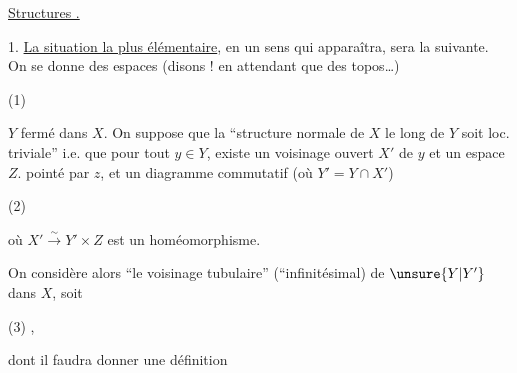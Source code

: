 
\uline{Structures .}

1. \uline{La situation la plus élémentaire}, en un sens qui apparaîtra, sera la suivante. On se donne des espaces (disons !\unsure{)|\}} en attendant que   des topos\ldots)

(1)

$Y$ fermé dans $X$. On suppose que la ``structure normale de $X$ le long de $Y$ soit loc. triviale''\unsure{)|\}} i.e. que pour tout $y\in Y$, existe un voisinage ouvert $X'$ de $y$ et un espace $Z$. pointé par $z$, et un diagramme commutatif (où $Y'=Y\cap X'$)

(2)

où $X'\xrightarrow{\sim}Y'\times Z$ est un homéomorphisme.

On considère alors ``le voisinage tubulaire'' (``infinitésimal) de $\unsure{Y|Y'}$ dans $X$, soit

(3)
,

dont il faudra donner une définition

